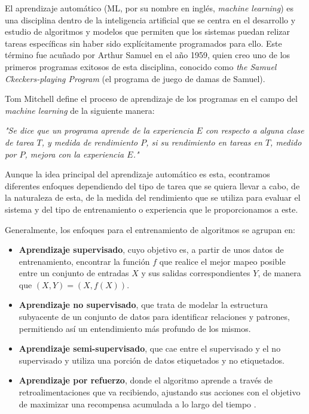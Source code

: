 \documentclass[11pt,spanish,listoffigures,listoftables]{tfgetsinf}
\begin{document}
El aprendizaje automático (ML, por su nombre en inglés, \textit{machine learning}) es una disciplina dentro de la inteligencia artificial que se centra en el desarrollo y estudio de algoritmos y modelos que permiten que los sistemas puedan relizar tareas específicas sin haber sido explícitamente programados para ello. Este término fue acuñado por Arthur Samuel en el año 1959, quien creo uno de los primeros programas exitosos de esta disciplina, conocido como \textit{the Samuel Ckeckers-playing Program} \cite{samuelCheckers} (el programa de juego de damas de Samuel).

Tom Mitchell \cite{mitchell1997mcgraw} define el proceso de aprendizaje de los programas en el campo del \textit{machine learning} de la siguiente manera:

\begin{displayquote}
\textit{"Se dice que un programa aprende de la experiencia $E$ con respecto a alguna clase de tarea $T$, y medida de rendimiento $P$, si su rendimiento en tareas en $T$, medido por $P$, mejora con la experiencia $E$."}
\end{displayquote}

Aunque la idea principal del aprendizaje automático es esta, econtramos diferentes enfoques dependiendo del tipo de tarea que se quiera llevar a cabo, de la naturaleza de esta, de la medida del rendimiento que se utiliza para evaluar el sistema y del tipo de entrenamiento o experiencia que le proporcionamos a este.

Generalmente, los enfoques para el entrenamiento de algoritmos se agrupan en:

\begin{itemize}
	\item \textbf{Aprendizaje supervisado}, cuyo objetivo es, a partir de unos datos de entrenamiento, encontrar la función $f$ que realice el mejor mapeo posible entre un conjunto de entradas $X$ y sus salidas correspondientes $Y$, de manera que $(X, Y) = (X, f(X))$.
	\item \textbf{Aprendizaje no supervisado}, que trata de modelar la estructura subyacente de un conjunto de datos para identificar relaciones y patrones, permitiendo así un entendimiento más profundo de los mismos.
	\item \textbf{Aprendizaje semi-supervisado}, que cae entre el supervisado y el no supervisado y utiliza una porción de datos etiquetados y no etiquetados.
	\item \textbf{Aprendizaje por refuerzo}, donde el algoritmo aprende a través de retroalimentaciones que va recibiendo, ajustando sus acciones con el objetivo de maximizar una recompensa acumulada a lo largo del tiempo \cite{mirtaheri2022machine}.

\end{itemize}
\end{document}
